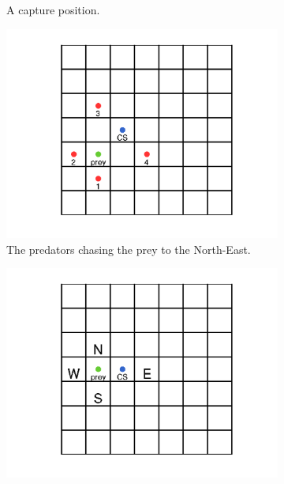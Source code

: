 \begin{figure}[t]
\begin{subfigure}[t]{0.19\textwidth}
\caption{A capture position.}    \label{fig:capturepos}
\end{subfigure}
\begin{subfigure}[t]{0.19\textwidth}
\centering
\captionsetup{width=0.9\textwidth}
\includegraphics[trim=7cm 3cm 6cm 2cm, clip=true, width=\gridwidth\textwidth]{plots/visuals/teamConfigApproach.png}
\caption{The predators chasing the prey to the North-East.}
\label{fig:capturepos}
\end{subfigure}
\begin{subfigure}[t]{0.19\textwidth}
\centering
\captionsetup{width=0.9\textwidth}
\includegraphics[trim=7cm 3cm 6cm 2cm, clip=true, width=\gridwidth\textwidth]{plots/visuals/targetStates_11.png}

\end{subfigure}
\end{figure}
